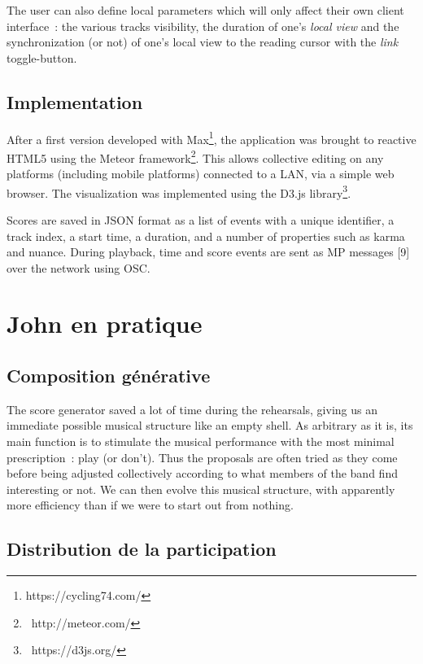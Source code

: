 The user can also define local parameters which will only affect their own client interface : the various tracks visibility, the duration of one's \textit{local view} and the synchronization (or not) of one's local view to the reading cursor with the \textit{link} toggle-button.

\subsection{Implementation}
After a first version developed with Max\footnote{https://cycling74.com/}, the application was brought to reactive HTML5 using the Meteor framework\footnote{ http://meteor.com/}. This allows collective editing on any platforms (including mobile platforms) connected to a LAN, via a simple web browser. The visualization was implemented using the D3.js library\footnote{ https://d3js.org/}.

Scores are saved in JSON format as a list of events with a unique identifier, a track index, a start time, a duration, and a number of properties such as karma and nuance. During playback, time and score events are sent as MP messages [9] over the network using \gls{OSC}.

\section{John en pratique}
\subsection{Composition générative}

The score generator saved a lot of time during the rehearsals, giving us an immediate possible musical structure like an empty shell. As arbitrary as it is, its main function is to stimulate the musical performance with the most minimal prescription : play (or don't). Thus the proposals are often tried as they come before being adjusted collectively according to what members of the band find interesting or not. We can then evolve this musical structure, with apparently more efficiency than if we were to start out from nothing.
\subsection{Distribution de la participation}


